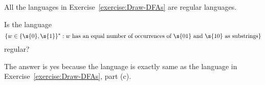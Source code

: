 \begin{flex}

\begin{example} \label{example:Some-examples-of-regular-languages}
All the languages in Exercise~\ref{exercise:Draw-DFAs} are regular languages.
\end{example}
\end{flex}


\begin{flex}
\begin{exercise} \label{exercise:Equal-number-of-01s-and-10s}
Is the language
\[
    \{w \in \{\s{0},\s{1}\}^* : w \text{ has an equal number of occurrences of $\s{01}$ and $\s{10}$ as substrings}\}
\]
regular?
\end{exercise}


\begin{solution}
The answer is yes because the language is exactly same as the language in Exercise~\ref{exercise:Draw-DFAs}, part (c).
\end{solution}
\end{flex}










